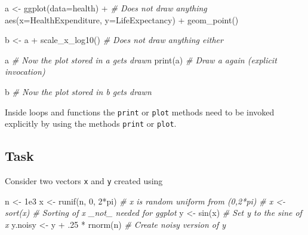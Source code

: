 \documentclass[
]{book}
\newenvironment{Shaded}{\begin{snugshade}}{\end{snugshade}}
\newcommand{\AttributeTok}[1]{\textcolor[rgb]{0.77,0.63,0.00}{#1}}
\newcommand{\CommentTok}[1]{\textcolor[rgb]{0.56,0.35,0.01}{\textit{#1}}}
\newcommand{\DecValTok}[1]{\textcolor[rgb]{0.00,0.00,0.81}{#1}}
\newcommand{\FloatTok}[1]{\textcolor[rgb]{0.00,0.00,0.81}{#1}}
\newcommand{\FunctionTok}[1]{\textcolor[rgb]{0.00,0.00,0.00}{#1}}
\newcommand{\NormalTok}[1]{#1}
\newcommand{\OtherTok}[1]{\textcolor[rgb]{0.56,0.35,0.01}{#1}}
\newcommand{\SpecialCharTok}[1]{\textcolor[rgb]{0.00,0.00,0.00}{#1}}
\begin{document}
\begin{Shaded}
\begin{Highlighting}[]
\NormalTok{a }\OtherTok{\textless{}{-}} \FunctionTok{ggplot}\NormalTok{(}\AttributeTok{data=}\NormalTok{health) }\SpecialCharTok{+}            \CommentTok{\# Does not draw anything}
         \FunctionTok{aes}\NormalTok{(}\AttributeTok{x=}\NormalTok{HealthExpenditure, }\AttributeTok{y=}\NormalTok{LifeExpectancy) }\SpecialCharTok{+}
         \FunctionTok{geom\_point}\NormalTok{()}

\NormalTok{b }\OtherTok{\textless{}{-}}\NormalTok{ a }\SpecialCharTok{+} \FunctionTok{scale\_x\_log10}\NormalTok{()              }\CommentTok{\# Does not draw anything either}

\NormalTok{a                                     }\CommentTok{\# Now the plot stored in a gets drawn}
\FunctionTok{print}\NormalTok{(a)                              }\CommentTok{\# Draw a again (explicit invocation)}

\NormalTok{b                                     }\CommentTok{\# Now the plot stored in b gets drawn}
\end{Highlighting}
\end{Shaded}

Inside loops and functions the \texttt{print} or \texttt{plot} methods need to be invoked explicitly by using the methods \texttt{print} or \texttt{plot}.

\hypertarget{task-7}{%
\subsection{Task}\label{task-7}}

Consider two vectors \texttt{x} and \texttt{y} created using

\begin{Shaded}
\begin{Highlighting}[]
\NormalTok{n }\OtherTok{\textless{}{-}} \FloatTok{1e3}
\NormalTok{x }\OtherTok{\textless{}{-}} \FunctionTok{runif}\NormalTok{(n, }\DecValTok{0}\NormalTok{, }\DecValTok{2}\SpecialCharTok{*}\NormalTok{pi)                   }\CommentTok{\# x is random uniform from (0,2*pi)}
\CommentTok{\# x \textless{}{-} sort(x)                           \# Sorting of x \_not\_ needed for ggplot}
\NormalTok{y }\OtherTok{\textless{}{-}} \FunctionTok{sin}\NormalTok{(x)                              }\CommentTok{\# Set y to the sine of x}
\NormalTok{y.noisy }\OtherTok{\textless{}{-}}\NormalTok{ y }\SpecialCharTok{+}\NormalTok{ .}\DecValTok{25} \SpecialCharTok{*} \FunctionTok{rnorm}\NormalTok{(n)            }\CommentTok{\# Create noisy version of y}
\end{Highlighting}
\end{Shaded}
\end{document}
